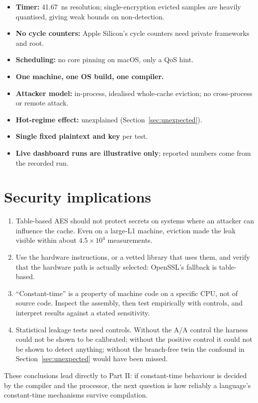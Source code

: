 \begin{itemize}
  \item \textbf{Timer:} 41.67~ns resolution; single-encryption evicted samples are heavily quantised, giving weak bounds on non-detection.
  \item \textbf{No cycle counters:} Apple Silicon's cycle counters need private frameworks and root.
  \item \textbf{Scheduling:} no core pinning on macOS, only a QoS hint.
  \item \textbf{One machine, one OS build, one compiler.}
  \item \textbf{Attacker model:} in-process, idealised whole-cache eviction; no cross-process or remote attack.
  \item \textbf{Hot-regime effect:} unexplained (Section~\ref{sec:unexpected}).
  \item \textbf{Single fixed plaintext and key} per test.
  \item \textbf{Live dashboard runs are illustrative only}; reported numbers come from the recorded run.
\end{itemize}

\section{Security implications}

\begin{enumerate}
  \item Table-based AES should not protect secrets on systems where an attacker can influence the cache. Even on a large-L1 machine, eviction made the leak visible within about $4.5\times10^4$ measurements.
  \item Use the hardware instructions, or a vetted library that uses them, and verify that the hardware path is actually selected: OpenSSL's fallback is table-based.
  \item ``Constant-time'' is a property of machine code on a specific CPU, not of source code. Inspect the assembly, then test empirically with controls, and interpret results against a stated sensitivity.
  \item Statistical leakage tests need controls. Without the A/A control the harness could not be shown to be calibrated; without the positive control it could not be shown to detect anything; without the branch-free twin the confound in Section~\ref{sec:unexpected} would have been missed.
\end{enumerate}

These conclusions lead directly to Part II: if constant-time behaviour is decided by the compiler and the processor, the next question is how reliably a language's constant-time mechanisms survive compilation.
